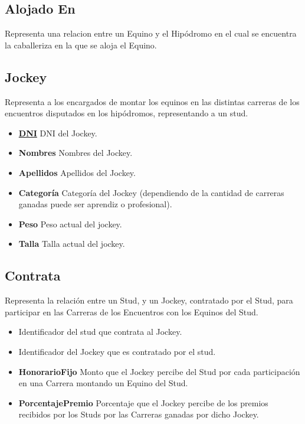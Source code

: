 \documentclass[a4paper,11pt]{article}
\begin{document}
\subsection{Alojado En}

Representa una relacion entre un Equino y el Hipódromo en el cual
se encuentra la caballeriza en la que se aloja el Equino.

\subsection{Jockey}

Representa a los encargados de montar los equinos en las distintas carreras 
de los encuentros disputados en los hipódromos, representando a un stud.

\begin{itemize}

  \item \textbf{\uline{DNI}} DNI del Jockey.
  
  \item \textbf{Nombres} Nombres del Jockey.
  
  \item \textbf{Apellidos} Apellidos del Jockey.

  \item \textbf{Categoría} Categoría del Jockey (dependiendo de la cantidad
  de carreras ganadas puede ser aprendiz o profesional).
  
  \item \textbf{Peso} Peso actual del jockey.
  
  \item \textbf{Talla} Talla actual del jockey.  
  
\end{itemize}

\subsection{Contrata}

Representa la relación entre un Stud, y un Jockey, contratado por el Stud, para
participar en las Carreras de los Encuentros con los Equinos del Stud.

\begin{itemize}

  \item \textbf{\uline{}} Identificador del stud que contrata
    al Jockey.

  \item \textbf{\uline{}} Identificador del Jockey que es
    contratado por el stud.

  \item \textbf{HonorarioFijo} Monto que el Jockey percibe del Stud por cada
    participación en una Carrera montando un Equino del Stud.
  
  \item \textbf{PorcentajePremio} Porcentaje que el Jockey percibe de los premios
    recibidos por los Studs por las Carreras ganadas por dicho Jockey.
    
\end{itemize}
\end{document}
